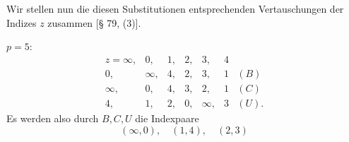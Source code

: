 Wir stellen nun die diesen Substitutionen entsprechenden Vertauschungen der Indizes $z$ zusammen [§ 79, (3)].

$p = 5$:
\[
\begin{array}{ccccccl}
z = \infty, & 0, & 1, & 2, & 3, & 4 & \\
0, & \infty, & 4, & 2, & 3, & 1 & (B)\\
\infty, & 0, & 4, & 3, & 2, & 1 & (C)\\
4, & 1, & 2, & 0, & \infty, & 3 & (U).
\end{array}
\]
Es werden also durch $B, C, U$ die Indexpaare
\[
(\infty, 0), \quad (1, 4), \quad (2, 3)
\]
